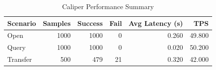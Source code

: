 \begin{table}
\caption{Caliper Performance Summary}
\label{tab:caliper_round}
\begin{tabular}{lrrrrr}
\toprule
Scenario & Samples & Success & Fail & Avg Latency (s) & TPS \\
\midrule
Open & 1000 & 1000 & 0 & 0.260 & 49.800 \\
Query & 1000 & 1000 & 0 & 0.020 & 50.200 \\
Transfer & 500 & 479 & 21 & 0.320 & 42.000 \\
\bottomrule
\end{tabular}
\end{table}
